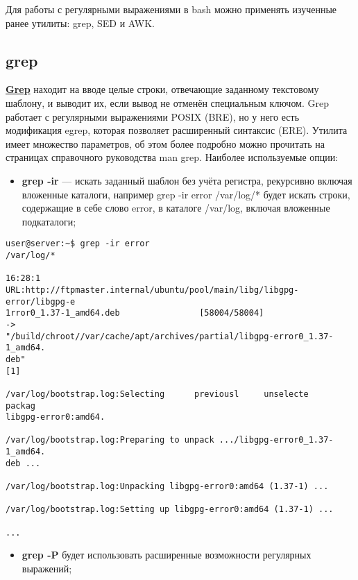 \documentclass[14pt, a4paper]{article}
\begin{document}
Для работы с регулярными выражениями в bash можно применять изученные ранее утилиты: grep,
SED и AWK.

\subsection*{grep} 

\href{https://ru.wikipedia.org/wiki/Grep}{\textbf{Grep}} находит на вводе целые строки, отвечающие заданному текстовому шаблону, и выводит их, если
вывод не отменён специальным ключом. Grep работает с регулярными выражениями POSIX (BRE),
но у него есть модификация egrep, которая позволяет расширенный синтаксис (ERE). Утилита имеет
множество параметров, об этом более подробно можно прочитать на страницах справочного
руководства man grep. Наиболее используемые опции:

\begin{itemize}
    \item \textbf{grep -ir} — искать заданный шаблон без учёта регистра, рекурсивно включая вложенные
    каталоги, например \colorbox{backcolour}{grep -ir error /var/log/*} будет искать строки, содержащие в себе
    слово error, в каталоге /var/log, включая вложенные подкаталоги;
\end{itemize}

\begin{lstlisting}
user@server:~$ grep -ir error
/var/log/*
                                                                  16:28:1
URL:http://ftpmaster.internal/ubuntu/pool/main/libg/libgpg-error/libgpg-e
1rror0_1.37-1_amd64.deb                [58004/58004]                    ->
"/build/chroot//var/cache/apt/archives/partial/libgpg-error0_1.37-1_amd64.
deb"
[1]

/var/log/bootstrap.log:Selecting      previousl     unselecte     packag
libgpg-error0:amd64.

/var/log/bootstrap.log:Preparing to unpack .../libgpg-error0_1.37-1_amd64.
deb ...

/var/log/bootstrap.log:Unpacking libgpg-error0:amd64 (1.37-1) ...

/var/log/bootstrap.log:Setting up libgpg-error0:amd64 (1.37-1) ...

...
\end{lstlisting}

\begin{itemize}
    \item \textbf{grep -P} будет использовать расширенные возможности регулярных выражений;
\end{itemize}
\end{document}
